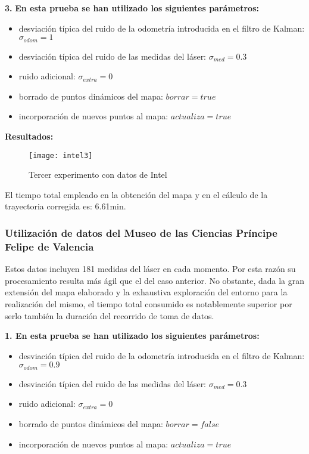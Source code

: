 \noindent
\textbf{3.} \textbf{En esta prueba se han utilizado los siguientes parámetros:}
\begin{itemize}
  \item desviación típica del ruido de la odometría introducida en el filtro de Kalman: $\sigma_{odom} = 1$
  \item desviación típica del ruido de las medidas del láser: $\sigma_{med} = 0.3$
  \item ruido adicional: $\sigma_{extra} = 0$
  \item borrado de puntos dinámicos del mapa: $borrar = true$
  \item incorporación de nuevos puntos al mapa: $actualiza = true$
\end{itemize}


\textbf{Resultados:}

\begin{figure}[h]
  \centering\texttt{[image: intel3]}\\
  \caption{Tercer experimento con datos de Intel}\label{fg:intel3}
\end{figure}

El tiempo total empleado en la obtención del mapa y en el cálculo de la trayectoria corregida es: 6.61min.

\subsubsection{Utilización de datos del Museo de las Ciencias Príncipe Felipe de Valencia}
Estos datos incluyen 181 medidas del láser en cada momento. Por esta razón su procesamiento resulta más ágil que el del caso anterior. No obstante, dada la gran extensión del mapa elaborado y la exhaustiva exploración del entorno para la realización del mismo, el tiempo total consumido es notablemente superior por serlo también la duración del recorrido de toma de datos.

\noindent
\textbf{\textbf{1.} En esta prueba se han utilizado los siguientes parámetros:}
\begin{itemize}
  \item desviación típica del ruido de la odometría introducida en el filtro de Kalman: $\sigma_{odom} = 0.9$
  \item desviación típica del ruido de las medidas del láser: $\sigma_{med} = 0.3$
  \item ruido adicional: $\sigma_{extra} = 0$
  \item borrado de puntos dinámicos del mapa: $borrar = false$
  \item incorporación de nuevos puntos al mapa: $actualiza = true$
\end{itemize}


